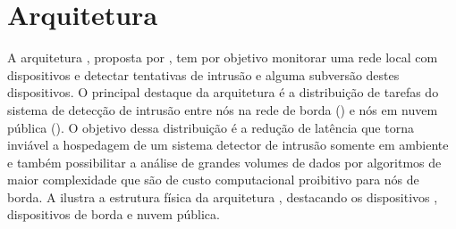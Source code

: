

\section{Arquitetura \idsiot}\label{sec:cassales}

A arquitetura \idsiot, proposta por , tem por objetivo
monitorar uma rede local com dispositivos \iot e detectar tentativas de intrusão
e alguma subversão destes dispositivos.
O principal destaque da arquitetura é a distribuição de tarefas do sistema de
detecção de intrusão entre nós na rede de borda (\fog) e nós em nuvem pública
(\cloud).
O objetivo dessa distribuição é a redução de latência que torna inviável a
hospedagem de um sistema detector de intrusão somente em ambiente \cloud e
também possibilitar a análise de grandes volumes de dados por algoritmos de
maior complexidade que são de custo computacional proibitivo para nós de borda.
A  ilustra a estrutura física da arquitetura \idsiot,
destacando os dispositivos \iot, dispositivos de borda e nuvem pública.

